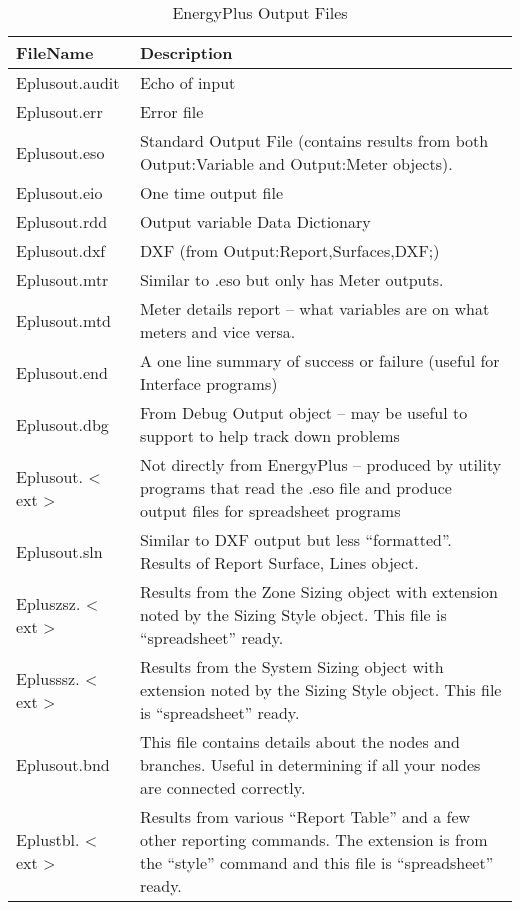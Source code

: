 \begin{longtable}[c]{p{1.5in}p{4.5in}}
\caption{EnergyPlus Output Files \protect \label{table:energyplus-output-files}}\\
\toprule 
FileName & Description \tabularnewline \midrule
\endhead
Eplusout.audit & Echo of input \tabularnewline
Eplusout.err & Error file \tabularnewline
Eplusout.eso & Standard Output File (contains results from both Output:Variable and Output:Meter objects). \tabularnewline
Eplusout.eio & One time output file \tabularnewline
Eplusout.rdd & Output variable Data Dictionary \tabularnewline
Eplusout.dxf & DXF (from Output:Report,Surfaces,DXF;) \tabularnewline
Eplusout.mtr & Similar to .eso but only has Meter outputs. \tabularnewline
Eplusout.mtd & Meter details report – what variables are on what meters and vice versa. \tabularnewline
Eplusout.end & A one line summary of success or failure (useful for Interface programs) \tabularnewline
Eplusout.dbg & From Debug Output object – may be useful to support to help track down problems \tabularnewline
Eplusout. < ext > & Not directly from EnergyPlus – produced by utility programs that read the .eso file and produce output files for spreadsheet programs \tabularnewline
Eplusout.sln & Similar to DXF output but less “formatted”. Results of Report Surface, Lines object. \tabularnewline
Epluszsz. < ext > & Results from the Zone Sizing object with extension noted by the Sizing Style object. This file is “spreadsheet” ready. \tabularnewline
Eplusssz. < ext > & Results from the System Sizing object with extension noted by the Sizing Style object. This file is “spreadsheet” ready. \tabularnewline
Eplusout.bnd & This file contains details about the nodes and branches. Useful in determining if all your nodes are connected correctly. \tabularnewline
Eplustbl. < ext > & Results from various “Report Table” and a few other reporting commands. The extension is from the “style” command and this file is “spreadsheet” ready. \tabularnewline
\bottomrule
\end{longtable}
